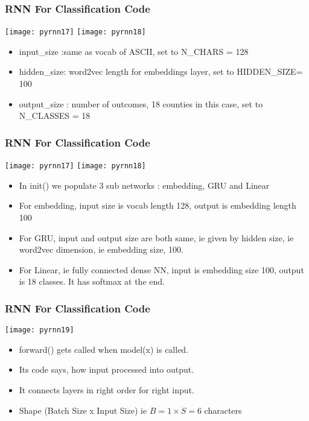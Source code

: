 \begin{frame}[fragile] \frametitle{RNN For Classification Code}
\begin{center}
\texttt{[image: pyrnn17]}
\texttt{[image: pyrnn18]}
\end{center}
\begin{itemize}
\item input\_size :same as vocab of ASCII, set to N\_CHARS = 128
\item hidden\_size:  word2vec length for embeddings layer, set to HIDDEN\_SIZE= 100
\item output\_size : number of outcomes, 18 counties in this case, set to N\_CLASSES = 18
\end{itemize}

\end{frame}

\begin{frame}[fragile] \frametitle{RNN For Classification Code}
\begin{center}
\texttt{[image: pyrnn17]}
\texttt{[image: pyrnn18]}
\end{center}
\begin{itemize}
\item In init() we populate 3 sub networks : embedding, GRU and Linear
\item For embedding, input size is vocab length 128, output is embedding length 100
\item For GRU, input and output size are both same, ie given by hidden size, ie word2vec dimension, ie embedding size, 100.
\item For Linear, ie fully connected dense NN, input is embedding size 100, output is 18 classes. It has softmax at the end.
\end{itemize}

\end{frame}

\begin{frame}[fragile] \frametitle{RNN For Classification Code}
\begin{center}
\texttt{[image: pyrnn19]}
\end{center}
\begin{itemize}
\item forward() gets called when model(x) is called.
\item Its code says, how input processed into output. 
\item It connects layers in right order for right input. 
\item Shape (Batch Size x Input Size) ie $B=1 \times S=6$ characters
\end{itemize}

\end{frame}


